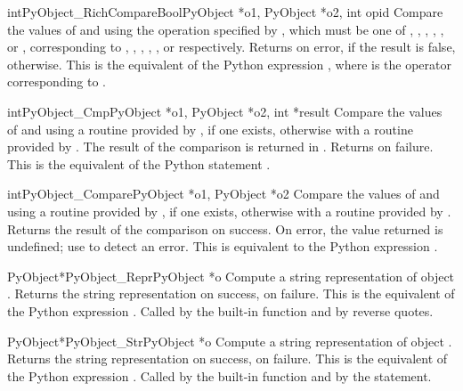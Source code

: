 \begin{cfuncdesc}{int}{PyObject_RichCompareBool}{PyObject *o1,
                                                 PyObject *o2, int opid}
  Compare the values of  and  using the operation
  specified by , which must be one of
  ,
  ,
  ,
  ,
  , or
  , corresponding to
  \code{<},
  \code{<=},
  \code{==},
  \code{!=},
  \code{>}, or
  \code{>=} respectively. Returns  on error,  if the
  result is false,  otherwise. This is the equivalent of the
  Python expression , where
   is the operator corresponding to .
\end{cfuncdesc}

\begin{cfuncdesc}{int}{PyObject_Cmp}{PyObject *o1, PyObject *o2, int *result}
  Compare the values of  and  using a routine provided
  by , if one exists, otherwise with a routine provided by
  .  The result of the comparison is returned in
  .  Returns  on failure.  This is the equivalent
  of the Python statement .
\end{cfuncdesc}


\begin{cfuncdesc}{int}{PyObject_Compare}{PyObject *o1, PyObject *o2}
  Compare the values of  and  using a routine provided
  by , if one exists, otherwise with a routine provided by
  .  Returns the result of the comparison on success.  On
  error, the value returned is undefined; use
   to detect an error.  This is equivalent
  to the Python expression .
\end{cfuncdesc}


\begin{cfuncdesc}{PyObject*}{PyObject_Repr}{PyObject *o}
  Compute a string representation of object .  Returns the
  string representation on success, \NULL{} on failure.  This is the
  equivalent of the Python expression .  Called by
  the  built-in function and by
  reverse quotes.
\end{cfuncdesc}


\begin{cfuncdesc}{PyObject*}{PyObject_Str}{PyObject *o}
  Compute a string representation of object .  Returns the
  string representation on success, \NULL{} on failure.  This is the
  equivalent of the Python expression .  Called by
  the  built-in function and by the
   statement.
\end{cfuncdesc}


